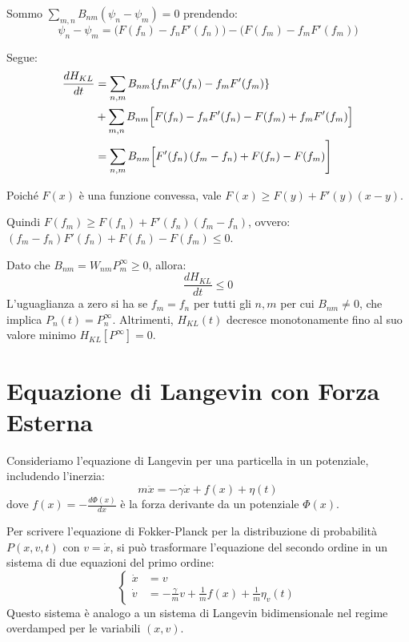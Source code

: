 Sommo $\sum_{m,n} B_{nm} (\psi_n - \psi_m) = 0$ prendendo:
\begin{equation*} 
\psi_n - \psi_m = \biggl(F(f_n) -f_n F'(f_n) \biggr)- \biggl( F(f_m) -f_m F'(f_m) \biggr) 
\end{equation*}

Segue:
\begin{align*}
\frac{dH_{KL}}{dt} &= \sum_{n,m} B_{nm} \{ f_m F'(f_n) - f_m F'(f_m) \} \\ &+ \sum_{m,n} B_{nm} \Bigl[ F(f_n) -f_n F'(f_n) - F(f_m) +f_m F'(f_m)\Bigr] \\ 
&=\sum_{n,m} B_{nm} \Bigl[ F'(f_n) \left( f_m -f_n\right) + F(f_n) - F(f_m)  \Biggr]
\end{align*}

\noindent Poiché $F(x)$ è una funzione convessa, vale $F(x) \ge F(y) + F'(y)(x-y)$. 

\noindent Quindi $F(f_m) \ge F(f_n) + F'(f_n)(f_m-f_n)$, ovvero: $(f_m-f_n)F'(f_n) + F(f_n) - F(f_m) \le 0$.

\noindent Dato che $B_{nm} = W_{nm}P_m^\infty \ge 0$, allora:
\begin{equation*}
\frac{dH_{KL}}{dt} \le 0
\end{equation*}
L'uguaglianza a zero si ha se $f_m = f_n$ per tutti gli $n,m$ per cui $B_{nm} \neq 0$, che implica $P_n(t) = P_n^{\infty}$. Altrimenti, $H_{KL}(t)$ decresce monotonamente fino al suo valore minimo $H_{KL}[P^{\infty}]=0$.

\section{Equazione di Langevin con Forza Esterna}
Consideriamo l'equazione di Langevin per una particella in un potenziale, includendo l'inerzia:
\begin{equation}
m\ddot{x} = -\gamma\dot{x} + f(x) + \eta(t)
\end{equation}
dove $f(x) = -\frac{d\Phi(x)}{dx}$ è la forza derivante da un potenziale $\Phi(x)$.

Per scrivere l'equazione di Fokker-Planck per la distribuzione di probabilità $P(x,v,t)$ con $v=\dot{x}$, si può trasformare l'equazione del secondo ordine in un sistema di due equazioni del primo ordine:
\begin{equation}
\begin{cases}
\dot{x} &= v \\
\dot{v} &= -\frac{\gamma}{m}v + \frac{1}{m}f(x) + \frac{1}{m}\eta_v(t)
\end{cases}
\end{equation}
Questo sistema è analogo a un sistema di Langevin bidimensionale nel regime overdamped per le variabili $(x,v)$.

